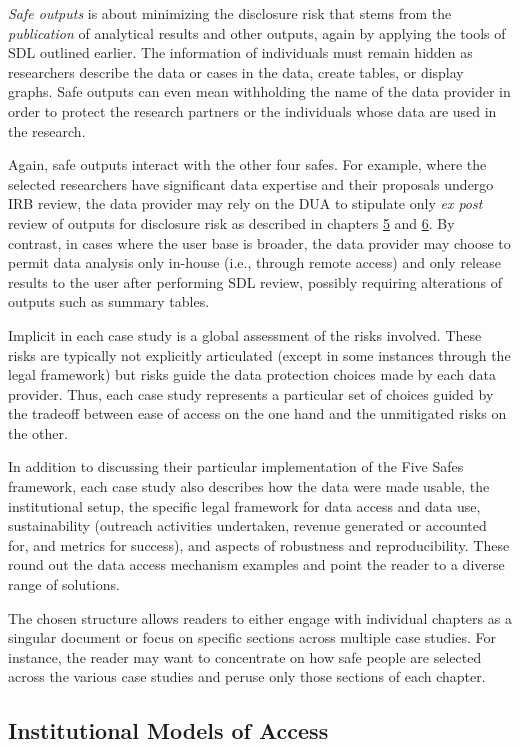 \emph{Safe outputs} is about minimizing the disclosure risk that stems from the \emph{publication} of analytical results and other outputs, again by applying the tools of SDL outlined earlier. The information of individuals must remain hidden as researchers describe the data or cases in the data, create tables, or display graphs. Safe outputs can even mean withholding the name of the data provider in order to protect the research partners or the individuals whose data are used in the research.

Again, safe outputs interact with the other four safes. For example, where the selected researchers have significant data expertise and their proposals undergo IRB review, the data provider may rely on the DUA to stipulate only \emph{ex post} review of outputs for disclosure risk as described in chapters \protect\hyperlink{discavoid}{5} and \protect\hyperlink{diffpriv}{6}. By contrast, in cases where the user base is broader, the data provider may choose to permit data analysis only in-house (i.e., through remote access) and only release results to the user after performing SDL review, possibly requiring alterations of outputs such as summary tables.

Implicit in each case study is a global assessment of the risks involved. These risks are typically not explicitly articulated (except in some instances through the legal framework) but risks guide the data protection choices made by each data provider. Thus, each case study represents a particular set of choices guided by the tradeoff between ease of access on the one hand and the unmitigated risks on the other.

In addition to discussing their particular implementation of the Five Safes framework, each case study also describes how the data were made usable, the institutional setup, the specific legal framework for data access and data use, sustainability (outreach activities undertaken, revenue generated or accounted for, and metrics for success), and aspects of robustness and reproducibility. These round out the data access mechanism examples and point the reader to a diverse range of solutions.

The chosen structure allows readers to either engage with individual chapters as a singular document or focus on specific sections across multiple case studies. For instance, the reader may want to concentrate on how safe people are selected across the various case studies and peruse only those sections of each chapter.

\hypertarget{institutional-models-of-access}{%
\subsection{Institutional Models of Access}\label{institutional-models-of-access}}

